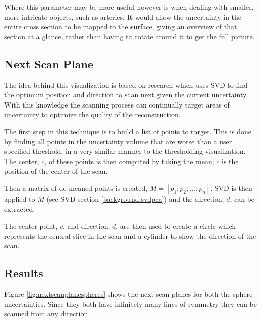 Where this parameter may be more useful however is when dealing with smaller, more intricate objects, such as arteries. It would allow the uncertainty in the entire cross section to be mapped to the surface, giving an overview of that section at a glance, rather than having to rotate around it to get the full picture.


\clearpage
\subsection{Next Scan Plane}\label{method:next_scan_plane}
The idea behind this visualization is based on research\cite{uncertaintysvd} which uses SVD to find the optimum position and direction to scan next given the current uncertainty. With this knowledge the scanning process can continually target areas of uncertainty to optimize the quality of the reconstruction.

The first step in this technique is to build a list of points to target. This is done by finding all points in the uncertainty volume that are worse than a user specified threshold, in a very similar manner to the thresholding visualization. The center, $c$, of these points is then computed by taking the mean; $c$ is the position of the center of the scan.

Then a matrix of de-meaned points is created, $M = [p_1; p_2; ... ; p_n]$. SVD is then applied to $M$ (see SVD section \ref{background:svdpca}) and the direction, $d$, can be extracted. 

The center point, $c$, and direction, $d$, are then used to create a circle which represents the central slice in the scan and a cylinder to show the direction of the scan.

\subsection*{Results}
Figure \ref{fig:nextscanplanespheres} shows the next scan planes for both the sphere uncertainties. Since they both have infinitely many lines of symmetry they can be scanned from any direction.

